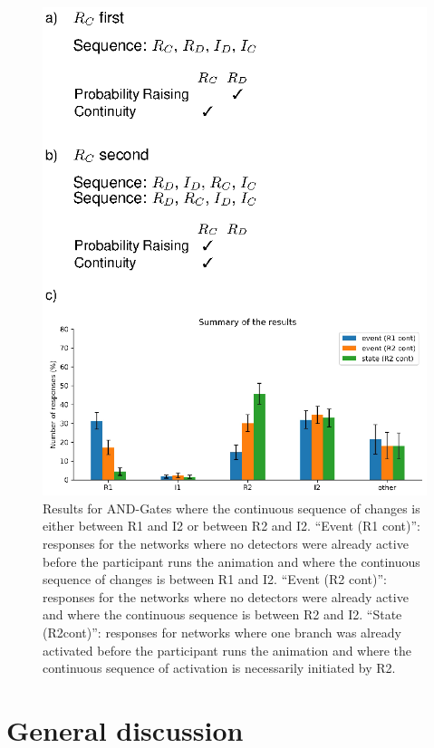 \documentclass[10pt,letterpaper]{article}
\begin{document}
\begin{figure}[H]
\begin{center}
\includegraphics{figures/expt2.eps}
\end{center}
\caption{Results for AND-Gates where the continuous sequence of changes is either between R1 and I2 or between R2 and I2. ``Event (R1 cont)'': responses for the networks where no detectors were already active before the participant runs the animation and where the continuous sequence of changes is between R1 and I2. ``Event (R2 cont)'': responses for the networks where no detectors were already active and where the continuous sequence is between R2 and I2. ``State (R2cont)'': responses for networks where one branch was already activated before the participant runs the animation and where the continuous sequence of activation is necessarily initiated by R2.} 
\label{fig:4}
\end{figure}

\newpage
\section{General discussion}
\end{document}
